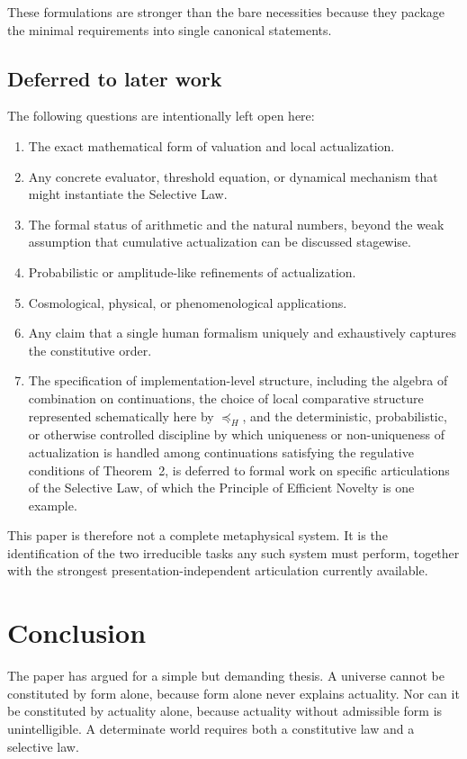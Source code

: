 \documentclass[11pt]{article}
\theoremstyle{foundation}
\begin{document}
These formulations are stronger than the bare necessities because they package the minimal requirements into single canonical statements.

\subsection{Deferred to later work}

The following questions are intentionally left open here:

\begin{enumerate}
    \item The exact mathematical form of valuation and local actualization.
    \item Any concrete evaluator, threshold equation, or dynamical mechanism that might instantiate the Selective Law.
    \item The formal status of arithmetic and the natural numbers, beyond the weak assumption that cumulative actualization can be discussed stagewise.
    \item Probabilistic or amplitude-like refinements of actualization.
    \item Cosmological, physical, or phenomenological applications.
    \item Any claim that a single human formalism uniquely and exhaustively captures the constitutive order.
    \item The specification of implementation-level structure, including the algebra of combination on continuations, the choice of local comparative structure represented schematically here by $\preceq_H$, and the deterministic, probabilistic, or otherwise controlled discipline by which uniqueness or non-uniqueness of actualization is handled among continuations satisfying the regulative conditions of Theorem~2, is deferred to formal work on specific articulations of the Selective Law, of which the Principle of Efficient Novelty is one example.
\end{enumerate}

This paper is therefore not a complete metaphysical system. It is the identification of the two irreducible tasks any such system must perform, together with the strongest presentation-independent articulation currently available.

\section{Conclusion}

The paper has argued for a simple but demanding thesis. A universe cannot be constituted by form alone, because form alone never explains actuality. Nor can it be constituted by actuality alone, because actuality without admissible form is unintelligible. A determinate world requires both a constitutive law and a selective law.
\end{document}

